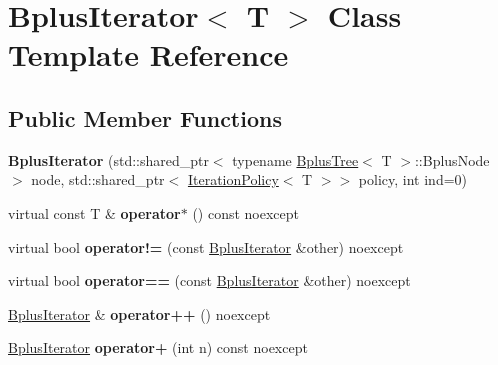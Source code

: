 \hypertarget{classBplusIterator}{}\section{Bplus\+Iterator$<$ T $>$ Class Template Reference}
\label{classBplusIterator}
\subsection*{Public Member Functions}
\begin{DoxyCompactItemize}
\item 
\mbox{\label{classBplusIterator_ac79950b9518ea1efb072684f746c7cbd}} 
{\bfseries Bplus\+Iterator} (std\+::shared\+\_\+ptr$<$ typename \hyperlink{classBplusTree}{Bplus\+Tree}$<$ T $>$\+::Bplus\+Node $>$ node, std\+::shared\+\_\+ptr$<$ \hyperlink{classIterationPolicy}{Iteration\+Policy}$<$ T $>$$>$ policy, int ind=0)
\item 
\mbox{\label{classBplusIterator_a7fd77774ee1ad383660bf9aa21d4d3ea}} 
virtual const T \& {\bfseries operator$\ast$} () const noexcept
\item 
\mbox{\label{classBplusIterator_a6e601dfc6d3b0a2d354c8395792f5dd9}} 
virtual bool {\bfseries operator!=} (const \hyperlink{classBplusIterator}{Bplus\+Iterator} \&other) noexcept
\item 
\mbox{\label{classBplusIterator_a883508beb8b5d51925b9d02b1cf3e8a7}} 
virtual bool {\bfseries operator==} (const \hyperlink{classBplusIterator}{Bplus\+Iterator} \&other) noexcept
\item 
\mbox{\label{classBplusIterator_af97d4391d72109935ff89f3958759765}} 
\hyperlink{classBplusIterator}{Bplus\+Iterator} \& {\bfseries operator++} () noexcept
\item 
\mbox{\label{classBplusIterator_a8f2c05823231463c8e7cf488a2bd6857}} 
\hyperlink{classBplusIterator}{Bplus\+Iterator} {\bfseries operator+} (int n) const noexcept
\end{DoxyCompactItemize}
